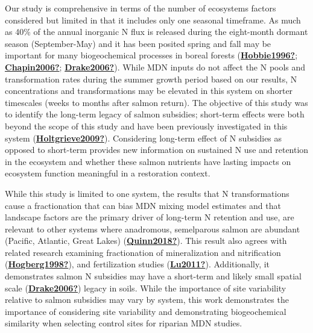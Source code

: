 \documentclass [11pt, proquest] {uwthesis}[2015/03/03]
\begin{document}
Our study is comprehensive in terms of the number of ecosystems factors considered but limited in that it includes only one seasonal timeframe. As much as 40\% of the annual inorganic N flux is released during the eight-month dormant season (September-May) and it has been posited spring and fall may be important for many biogeochemical processes in boreal forests (\protect\hyperlink{ref-Hobbie1996}{\textbf{Hobbie1996?}}; \protect\hyperlink{ref-Chapin2006}{\textbf{Chapin2006?}}; \protect\hyperlink{ref-Drake2006}{\textbf{Drake2006?}}). While MDN inputs do not affect the N pools and transformation rates during the summer growth period based on our results, N concentrations and transformations may be elevated in this system on shorter timescales (weeks to months after salmon return). The objective of this study was to identify the long-term legacy of salmon subsidies; short-term effects were both beyond the scope of this study and have been previously investigated in this system (\protect\hyperlink{ref-Holtgrieve2009}{\textbf{Holtgrieve2009?}}). Considering long-term effect of N subsidies as opposed to short-term provides new information on sustained N use and retention in the ecosystem and whether these salmon nutrients have lasting impacts on ecosystem function meaningful in a restoration context.

While this study is limited to one system, the results that N transformations cause a fractionation that can bias MDN mixing model estimates and that landscape factors are the primary driver of long-term N retention and use, are relevant to other systems where anadromous, semelparous salmon are abundant (Pacific, Atlantic, Great Lakes) (\protect\hyperlink{ref-Quinn2018}{\textbf{Quinn2018?}}). This result also agrees with related research examining fractionation of mineralization and nitrification (\protect\hyperlink{ref-Hogberg1998}{\textbf{Hogberg1998?}}), and fertilization studies (\protect\hyperlink{ref-Lu2011}{\textbf{Lu2011?}}). Additionally, it demonstrates salmon N subsidies may have a short-term and likely small spatial scale (\protect\hyperlink{ref-Drake2006}{\textbf{Drake2006?}}) legacy in soils. While the importance of site variability relative to salmon subsidies may vary by system, this work demonstrates the importance of considering site variability and demonstrating biogeochemical similarity when selecting control sites for riparian MDN studies.
\end{document}
